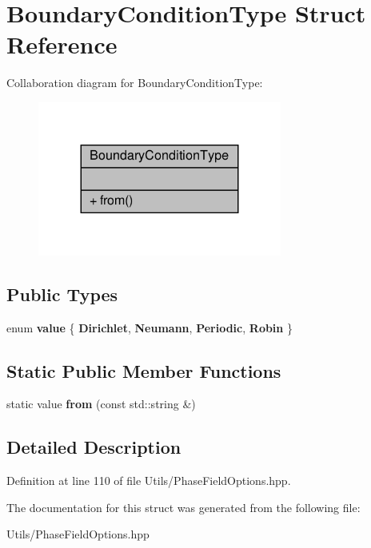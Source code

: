 \hypertarget{structBoundaryConditionType}{}\section{Boundary\+Condition\+Type Struct Reference}
\label{structBoundaryConditionType}


Collaboration diagram for Boundary\+Condition\+Type\+:\nopagebreak
\begin{figure}[H]
\begin{center}
\leavevmode
\includegraphics[width=227pt]{structBoundaryConditionType__coll__graph}
\end{center}
\end{figure}
\subsection*{Public Types}
\begin{DoxyCompactItemize}
\item 
\mbox{\label{structBoundaryConditionType_a3571a0166b96db9c4322ec66fb76c254}} 
enum {\bfseries value} \{ {\bfseries Dirichlet}, 
{\bfseries Neumann}, 
{\bfseries Periodic}, 
{\bfseries Robin}
 \}
\end{DoxyCompactItemize}
\subsection*{Static Public Member Functions}
\begin{DoxyCompactItemize}
\item 
\mbox{\label{structBoundaryConditionType_abd1f82993a717a61249de91d2cff67e4}} 
static value {\bfseries from} (const std\+::string \&)
\end{DoxyCompactItemize}


\subsection{Detailed Description}


Definition at line 110 of file Utils/\+Phase\+Field\+Options.\+hpp.



The documentation for this struct was generated from the following file\+:\begin{DoxyCompactItemize}
\item 
Utils/\+Phase\+Field\+Options.\+hpp\end{DoxyCompactItemize}
